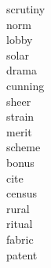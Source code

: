 \documentclass[a4paper, 10pt]{ctexart}
\begin{document}
\begin{multicols*}{2}
\begin{description}
\item[scrutiny]

\item[norm]

\item[lobby]

\item[solar]

\item[drama]

\item[cunning]

\item[sheer]

\item[strain]

\item[merit]

\item[scheme]

\item[bonus]

\item[cite]

\item[census]

\item[rural]

\item[ritual]

\item[fabric]

\item[patent]

    \end{description}
\end{multicols*}
\end{document}
